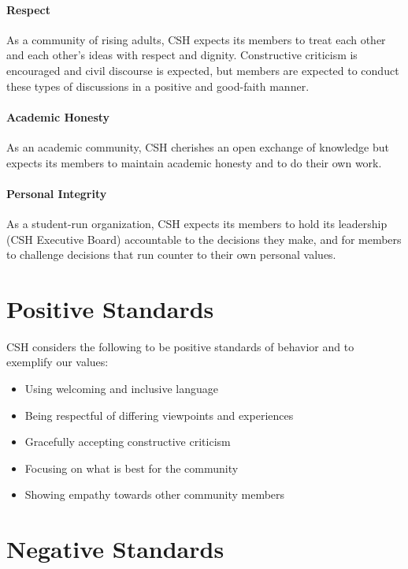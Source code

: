 \documentclass{article}
\begin{document}
\paragraph{Respect}

As a community of rising adults, CSH expects its members to treat each other
and each other’s ideas with respect and dignity. Constructive criticism is
encouraged and civil discourse is expected, but members are expected to
conduct these types of discussions in a positive and good-faith manner.

\paragraph{Academic Honesty}

As an academic community, CSH cherishes an open exchange of knowledge but
expects its members to maintain academic honesty and to do their own work.

\paragraph{Personal Integrity}

As a student-run organization, CSH expects its members to hold its leadership
(CSH Executive Board) accountable to the decisions they make, and for members
to challenge decisions that run counter to their own personal values.

\section*{Positive Standards}

CSH considers the following to be positive standards of behavior and to
exemplify our values:

\begin{itemize}
    \item{Using welcoming and inclusive language}
    \item{Being respectful of differing viewpoints and experiences}
    \item{Gracefully accepting constructive criticism}
    \item{Focusing on what is best for the community}
    \item{Showing empathy towards other community members}
\end{itemize}

\section*{Negative Standards}
\end{document}
